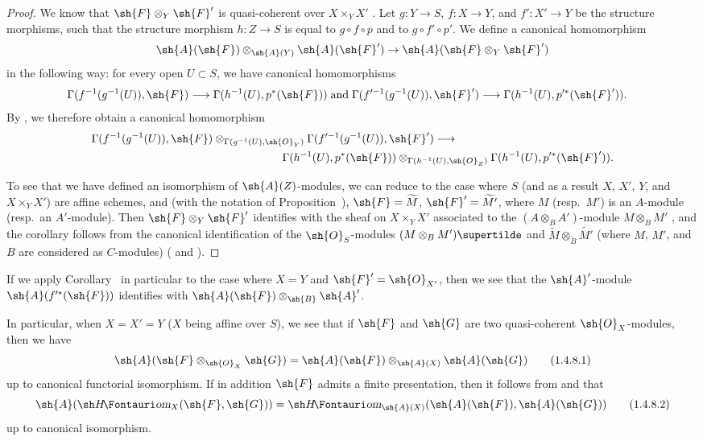 \begin{proof}
We know that $\sh{F}\otimes_Y\sh{F}'$ is quasi-coherent over $X\times_Y X'$ .
Let $g:Y\to S$, $f:X\to Y$, and $f':X'\to Y$ be the structure morphisms, such that the structure morphism
$h:Z\to S$ is equal to $g\circ f\circ p$ and to $g\circ f'\circ p'$.
We define a canonical homomorphism
\[
  \sh{A}(\sh{F})\otimes_{\sh{A}(Y)}\sh{A}(\sh{F}')\to\sh{A}(\sh{F}\otimes_Y\sh{F}')
\]
in the following way: for every open $U\subset S$, we have canonical homomorphisms
\[
  \begin{aligned}
  \Gamma(f^{-1}(g^{-1}(U)),\sh{F})
  &\longrightarrow\Gamma(h^{-1}(U),p^*(\sh{F}))\;\text{and}\;
  \Gamma(f^{\prime-1}(g^{-1}(U)),\sh{F}')
  \longrightarrow\Gamma(h^{-1}(U),p^{\prime*}(\sh{F}')).
  \end{aligned}
\]
By , we therefore obtain a canonical homomorphism
\[
  \begin{aligned}
  &\Gamma(f^{-1}(g^{-1}(U)),\sh{F})
    \otimes_{\Gamma(g^{-1}(U),\sh{O}_Y)}
    \Gamma(f^{\prime-1}(g^{-1}(U)),\sh{F}')\longrightarrow\\
  &\hspace{17em}
    \Gamma(h^{-1}(U),p^*(\sh{F}))
    \otimes_{\Gamma(h^{-1}(U),\sh{O}_Z)}
    \Gamma(h^{-1}(U),p^{\prime*}(\sh{F}')).
  \end{aligned}
\]

To see that we have defined an isomorphism of $\sh{A}(Z)$-modules, we can reduce to the case where $S$ (and as a result $X$, $X'$, $Y$, and $X\times_Y X'$) are affine schemes, and (with the notation of Proposition~), $\sh{F}=\widetilde{M}$, $\sh{F}'=\widetilde{M'}$, where $M$ (resp.~$M'$) is an $A$-module (resp.~an $A'$-module).
Then $\sh{F}\otimes_Y\sh{F}'$ identifies with the sheaf on $X\times_Y X'$ associated to the $(A\otimes_B A')$-module $M\otimes_B M'$ , and the corollary follows from the canonical identification of the $\sh{O}_S$-modules $(M\otimes_B M')\supertilde$ and $\widetilde{M}\otimes_{\widetilde{B}}\widetilde{M'}$ (where $M$, $M'$, and $B$ are considered as $C$-modules) ( and ).
\end{proof}

If we apply Corollary~ in particular to the case where $X=Y$ and $\sh{F}'=\sh{O}_{X'}$, then we see that the $\sh{A}'$-module $\sh{A}(f^{\prime*}(\sh{F}))$ identifies with $\sh{A}(\sh{F})\otimes_\sh{B}\sh{A}'$.

\begin{env}[1.4.8]
\label{II.1.4.8}
In particular, when $X=X'=Y$ ($X$ being affine over $S$), we see that if $\sh{F}$ and $\sh{G}$ are two quasi-coherent $\sh{O}_X$-modules, then we have
\[
\label{II.1.4.8.1}
  \sh{A}(\sh{F}\otimes_{\sh{O}_X}\sh{G})=\sh{A}(\sh{F})\otimes_{\sh{A}(X)}\sh{A}(\sh{G})
  \tag{1.4.8.1}
\]
up to canonical functorial isomorphism.
If in addition $\sh{F}$ admits a finite presentation, then it follows from  and  that
\[
\label{II.1.4.8.2}
  \sh{A}(\shHom_X(\sh{F},\sh{G}))=\shHom_{\sh{A}(X)}(\sh{A}(\sh{F}),\sh{A}(\sh{G}))
  \tag{1.4.8.2}
\]
up to canonical isomorphism.
\end{env}

